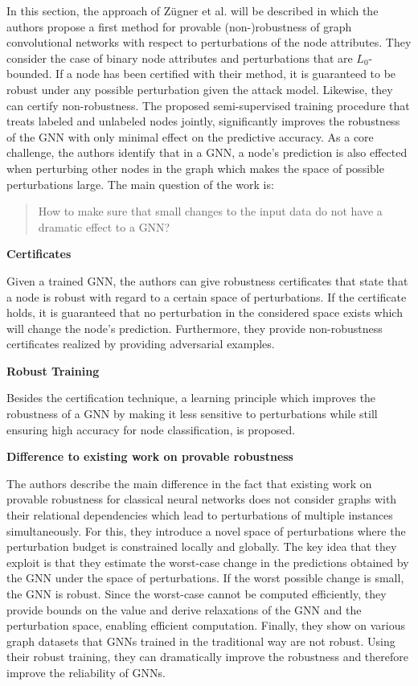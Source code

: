 \documentclass[a4paper,preprint]{sig-alternate}
\begin{document}
In this section, the approach of Zügner et al. \cite{Z_gner_2019} will be described
in which the authors propose a first method for provable (non-)robustness of graph convolutional networks with respect
to perturbations of the node attributes.\newline
They consider the case of binary node attributes and perturbations that are $L_0$-bounded. If a node has been certified
with their method, it is guaranteed to be robust under any possible perturbation given the attack model. Likewise, they can
certify non-robustness. The proposed semi-supervised training procedure that treats labeled and unlabeled nodes jointly,
significantly improves the robustness of the GNN with only minimal effect on the predictive accuracy.
As a core challenge, the authors identify that in a GNN, a node's prediction is also effected when perturbing other nodes in the graph
which makes the space of possible perturbations large. The main question of the work is:
\begin{quote}
How to make sure that small changes to the input data do not have a dramatic effect to a GNN?
\end{quote}

\textbf{Certificates}\newline

Given a trained GNN, the authors can give robustness certificates that state that a
node is robust with regard to a certain space of perturbations. If the certificate
holds, it is guaranteed that no perturbation in the considered space exists
which will change the node's prediction. Furthermore, they provide non-robustness
certificates realized by providing adversarial examples.\newline

\textbf{Robust Training}\newline

Besides the certification technique, a learning principle which improves the robustness of a GNN
by making it less sensitive to perturbations while still ensuring high accuracy for node classification, is proposed.\newline

\textbf{Difference to existing work on provable robustness}\newline

The authors describe the main difference in the fact that existing work on provable robustness for classical neural networks
does not consider graphs with their relational dependencies which lead to perturbations of multiple instances simultaneously.
For this, they introduce a novel space of perturbations where the perturbation budget is constrained locally and globally.
The key idea that they exploit is that they estimate the worst-case change in the predictions obtained by the GNN under
the space of perturbations. If the worst possible change is small, the GNN is robust. Since the worst-case cannot be computed
efficiently, they provide bounds on the value and derive relaxations of the GNN and the perturbation space, 
enabling efficient computation. Finally, they show on various graph datasets that GNNs trained in the traditional way are not robust. 
Using their robust training, they can dramatically improve the robustness and therefore improve the reliability of GNNs.
\end{document}
